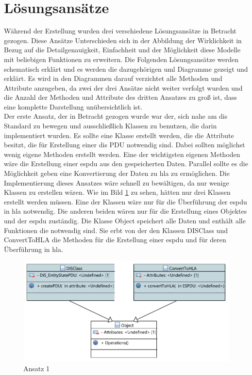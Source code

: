 \section{Lösungsansätze}\label{lös}
Während der Erstellung wurden drei verschiedene Lösungsansätze in Betracht gezogen.
Diese Ansätze Unterschieden sich in der Abbildung der Wirklichkeit in Bezug auf die Detailgenauigkeit, Einfachheit und der Möglichkeit diese Modelle mit beliebigen Funktionen zu erweitern. Die Folgenden Lösungsansätze werden schematisch erklärt und es werden die dazugehörigen \ac{uml} Diagramme gezeigt und erklärt. Es wird in den Diagrammen darauf verzichtet alle Methoden und Attribute anzugeben, da zwei der drei Ansätze nicht weiter verfolgt wurden und die Anzahl der Methoden und Attribute des dritten Ansatzes zu groß ist, dass eine komplette Darstellung unübersichtlich ist.\\
Der erste Ansatz, der in Betracht gezogen wurde war der, sich nahe am \ac{dis} Standard zu bewegen und ausschließlich Klassen zu benutzen, die darin implementiert wurden. Es sollte eine Klasse erstellt werden, die die Attribute besitzt, die für Erstellung einer \ac{dis} PDU notwendig sind. Dabei sollten möglichst wenig eigene Methoden erstellt werden. Eine der wichtigsten eigenen Methoden wäre die Erstellung einer \ac{espdu} aus den gespeicherten Daten. Parallel sollte es die Möglichkeit geben eine Konvertierung der Daten zu \ac{hla} zu ermöglichen. Die Implementierung dieses Ansatzes wäre schnell zu bewältigen, da nur wenige Klassen zu erstellen wären.  Wie im Bild \ref{ansatz1} zu sehen, hätten nur drei Klassen erstellt werden müssen. Eine der Klassen wäre nur für die Überführung der \ac{espdu} in \ac{hla} notwendig. Die anderen beiden wären nur für die Erstellung eines Objektes und der \ac{espdu} zuständig. 
Die Klasse \glqq Object \grqq{} speichert alle Daten und enthält alle Funktionen die notwendig sind. Sie erbt von der den Klassen  \glqq DISClass \grqq{} und  \glqq ConvertToHLA \grqq{} die Methoden für die Erstellung einer \ac{espdu} und für deren Überführung in \ac{hla}. 
 \begin{figure}[H]
	\centering
	\includegraphics[scale=0.9]{bilder/pdfvorlagen/ansatz2}
	\caption[Ansatz 1]{Ansatz 1}
	\label{ansatz1}
\end{figure}
